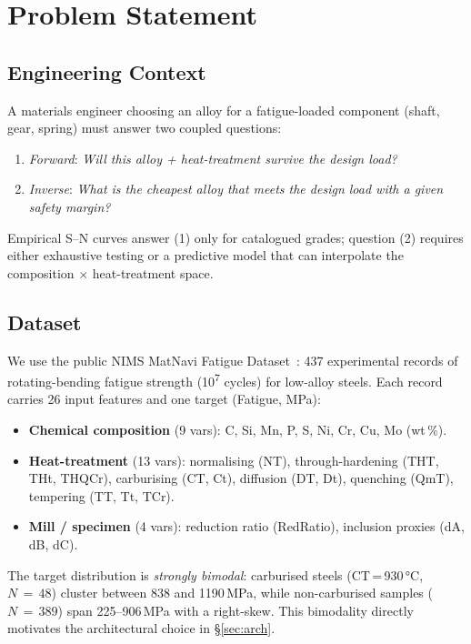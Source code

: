 \documentclass[12pt,a4paper]{article}
\begin{document}
\section{Problem Statement}

\subsection{Engineering Context}
A materials engineer choosing an alloy for a fatigue-loaded component (shaft, gear, spring)
must answer two coupled questions:
\begin{enumerate}[nosep]
  \item \emph{Forward}: \textit{Will this alloy + heat-treatment survive the design load?}
  \item \emph{Inverse}: \textit{What is the cheapest alloy that meets the design load
        with a given safety margin?}
\end{enumerate}
Empirical S--N curves answer (1) only for catalogued grades; question (2) requires either
exhaustive testing or a predictive model that can interpolate the composition $\times$
heat-treatment space.

\subsection{Dataset}
We use the public NIMS MatNavi Fatigue Dataset~\cite{agrawal2014}: 437 experimental records
of rotating-bending fatigue strength (10\textsuperscript{7} cycles) for low-alloy steels.
Each record carries 26 input features and one target (Fatigue, MPa):
\begin{itemize}[nosep]
  \item \textbf{Chemical composition} (9 vars): C, Si, Mn, P, S, Ni, Cr, Cu, Mo (wt\,\%).
  \item \textbf{Heat-treatment} (13 vars): normalising (NT), through-hardening (THT, THt,
        THQCr), carburising (CT, Ct), diffusion (DT, Dt), quenching (QmT), tempering (TT,
        Tt, TCr).
  \item \textbf{Mill / specimen} (4 vars): reduction ratio (RedRatio), inclusion proxies
        (dA, dB, dC).
\end{itemize}

The target distribution is \emph{strongly bimodal}: carburised steels (CT\,=\,930\,°C,
$N\,{=}\,48$) cluster between 838 and 1190\,MPa, while non-carburised samples
($N\,{=}\,389$) span 225--906\,MPa with a right-skew. This bimodality directly motivates
the architectural choice in §\ref{sec:arch}.
\end{document}
